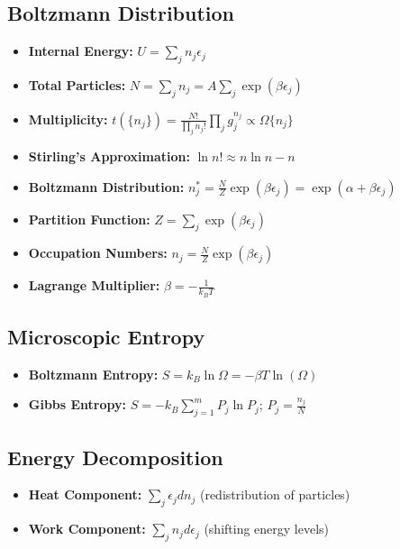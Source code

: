 \documentclass[12pt]{article}
\begin{document}
\subsection*{Boltzmann Distribution}
\begin{itemize}
    \item \textbf{Internal Energy:} $U = \sum_j n_j \epsilon_j$
    \item \textbf{Total Particles:} $N = \sum_j n_j=A\sum_j \exp(\beta \epsilon_j)$
    \item \textbf{Multiplicity:} $t(\{n_j\}) = \frac{N!}{\prod_j n_j!} \prod_j g_j^{n_j} \varpropto \Omega \{n_{j}\}$
    \item \textbf{Stirling's Approximation:} $\ln n! \approx n \ln n - n$
    \item \textbf{Boltzmann Distribution:} $n_j^* = \frac{N}{Z} \exp(\beta \epsilon_j)=\exp(\alpha+\beta\epsilon_j)$
    \item \textbf{Partition Function:} $Z = \sum_j \exp(\beta \epsilon_j)$
    \item \textbf{Occupation Numbers:} $n_j = \frac{N}{Z} \exp(\beta \epsilon_j)$
    \item \textbf{Lagrange Multiplier:} $\beta = -\frac{1}{k_BT}$
\end{itemize}

\subsection*{Microscopic Entropy}
\begin{itemize}
    \item \textbf{Boltzmann Entropy:} $S = k_B \ln \Omega= -\beta T \ln(\Omega)$
    \item \textbf{Gibbs Entropy:} $S = -k_B \sum_{j=1}^m P_j \ln P_j$; $P_j = \frac{n_j}{N}$
\end{itemize}

\subsection*{Energy Decomposition}
\begin{itemize}
    \item \textbf{Heat Component:} $\sum_j \epsilon_j dn_j$ (redistribution of particles)
    \item \textbf{Work Component:} $\sum_j n_j d\epsilon_j$ (shifting energy levels)
\end{itemize}
\end{document}
